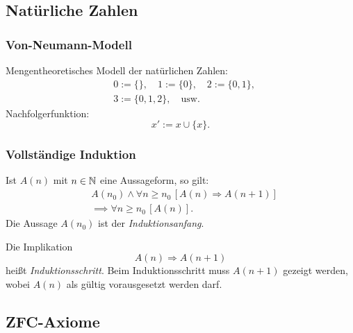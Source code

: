 \subsection{Natürliche Zahlen}
\subsubsection{Von-Neumann-Modell}
Mengentheoretisches Modell der natürlichen Zahlen:
\begin{equation}
\begin{split}
& 0:=\{\},\quad 1:=\{0\},\quad 2:=\{0,1\},\\
& 3:=\{0,1,2\},\quad \text{usw.}
\end{split}
\end{equation}
Nachfolgerfunktion:
\begin{equation}
x' := x\cup\{x\}.
\end{equation}
\subsubsection{Vollständige Induktion}
Ist $A(n)$ mit $n\in\mathbb N$
eine Aussageform, so gilt:
\begin{equation}
\begin{split}
& A(n_0)\land \forall n\ge n_0\,[A(n)\Rightarrow A(n+1)]\\
& \implies \forall n\ge n_0\,[A(n)].
\end{split}
\end{equation}
Die Aussage $A(n_0)$ ist der \emph{Induktionsanfang}.

Die Implikation
\begin{equation}
A(n)\Rightarrow A(n+1)
\end{equation}
heißt \emph{Induktionsschritt}. Beim Induktionsschritt muss
$A(n+1)$ gezeigt werden, wobei $A(n)$ als gültig vorausgesetzt werden
darf.

\subsection{ZFC-Axiome}


